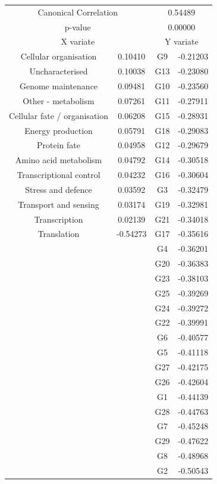 \begin{figure}[H]
\centering
\begin{tabular}{ c c | c c }
  \multicolumn{2}{c}{Canonical Correlation} &  \multicolumn{2}{c}{0.54489} \\
  \multicolumn{2}{c}{p-value} &  \multicolumn{2}{c}{0.00000} \\
  \hline
  \multicolumn{2}{c}{X variate} & \multicolumn{2}{c}{Y variate}\\
  \hline
 Cellular organisation & 0.10410 &  G9 & -0.21203\\
 Uncharacterised & 0.10038 &  G13 & -0.23080\\
 Genome maintenance & 0.09481 &  G10 & -0.23560\\
 Other - metabolism & 0.07261 &  G11 & -0.27911\\
 Cellular fate / organisation & 0.06208 &  G15 & -0.28931\\
 Energy production & 0.05791 &  G18 & -0.29083\\
 Protein fate & 0.04958 &  G12 & -0.29679\\
 Amino acid metabolism & 0.04792 &  G14 & -0.30518\\
 Transcriptional control & 0.04232 &  G16 & -0.30604\\
 Stress and defence & 0.03592 &  G3 & -0.32479\\
 Transport and sensing & 0.03174 &  G19 & -0.32981\\
 Transcription & 0.02139 &  G21 & -0.34018\\
 Translation & -0.54273 &  G17 & -0.35616\\
 & &  G4 & -0.36201\\
 & &  G20 & -0.36383\\
 & &  G23 & -0.38103\\
 & &  G25 & -0.39269\\
 & &  G24 & -0.39272\\
 & &  G22 & -0.39991\\
 & &  G6 & -0.40577\\
 & &  G5 & -0.41118\\
 & &  G27 & -0.42175\\
 & &  G26 & -0.42604\\
 & &  G1 & -0.44139\\
 & &  G28 & -0.44763\\
 & &  G7 & -0.45248\\
 & &  G29 & -0.47622\\
 & &  G8 & -0.48968\\
 & &  G2 & -0.50543\\

\end{tabular}
\end{figure}
